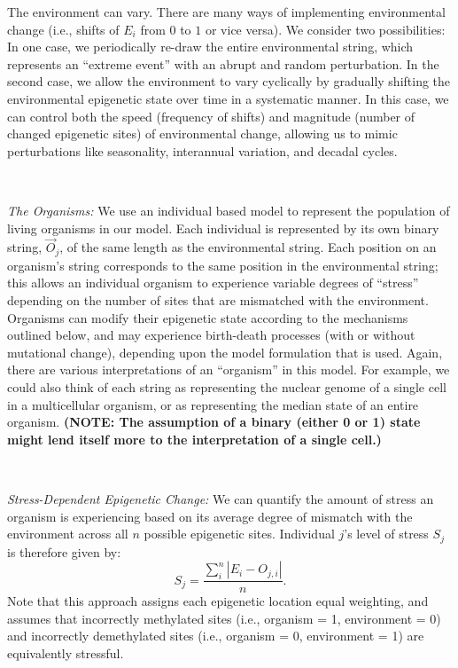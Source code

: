 \documentclass{article}
\begin{document}
The environment can vary. There are many ways of implementing environmental change (i.e., shifts of $E_i$ from $0$ to $1$ or vice versa). We consider two possibilities: In one case, we periodically re-draw the entire environmental string, which represents an ``extreme event'' with an abrupt and random perturbation. In the second case, we allow the environment to vary cyclically by gradually shifting the environmental epigenetic state over time in a systematic manner. In this case, we can control both the speed (frequency of shifts) and magnitude (number of changed epigenetic sites) of environmental change, allowing us to mimic perturbations like seasonality, interannual variation, and decadal cycles.
\ 

\ 

\noindent \textit{The Organisms:} We use an individual based model to represent the population of living organisms in our model. Each individual is represented by its own binary string, $\vec{O}_j$, of the same length as the environmental string. Each position on an organism's string corresponds to the same position in the environmental string; this allows an individual organism to experience variable degrees of ``stress'' depending on the number of sites that are mismatched with the environment. Organisms can modify their epigenetic state according to the mechanisms outlined below, and may experience birth-death processes (with or without mutational change), depending upon the model formulation that is used. Again, there are various interpretations of an ``organism'' in this model. For example, we could also think of each string as representing the nuclear genome of a single cell in a multicellular organism, or as representing the median state of an entire organism. \textbf{(NOTE: The assumption of a binary (either 0 or 1) state might lend itself more to the interpretation of a single cell.)}

\ 

\noindent \textit{Stress-Dependent Epigenetic Change:} We can quantify the amount of stress an organism is experiencing based on its average degree of mismatch with the environment across all $n$ possible epigenetic sites. Individual $j$'s level of stress $S_j$ is therefore given by:
\begin{equation}
   S_j = \frac{\sum_i ^n | E_i - O_{j,i} |}{n} .
\end{equation}
Note that this approach assigns each epigenetic location equal weighting, and assumes that incorrectly methylated sites (i.e., organism = 1, environment = 0) and incorrectly demethylated sites (i.e., organism = 0, environment = 1) are equivalently stressful.
\end{document}
